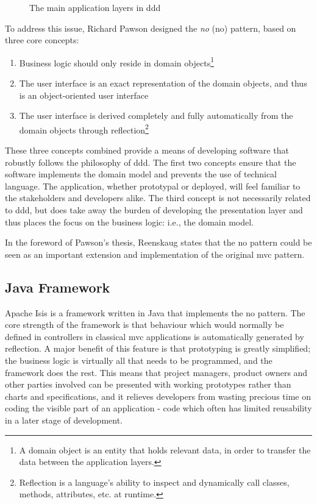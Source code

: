 \begin{figure}[h]
	\center
	
	\caption{The main application layers in \acrshort{ddd}}
	\label{figure:applicationlayers}
\end{figure}

To address this issue, Richard Pawson designed the \textit{\acrlong{no}} (\acrshort{no}) pattern, based on three core concepts\cite{pawson2002naked}:
\begin{enumerate}
	\item Business logic should only reside in domain objects\footnote{A domain object is an entity that holds relevant data, in order to transfer the data between the application layers.}
	
	\item The user interface is an exact representation of the domain objects, and thus is an object-oriented user interface
	
	\item The user interface is derived completely and fully automatically from the domain objects through reflection\footnote{Reflection is a language's ability to inspect and dynamically call classes, methods, attributes, etc. at runtime.}
\end{enumerate}

These three concepts combined provide a means of developing software that robustly follows the philosophy of \acrshort{ddd}. The first two concepts ensure that the software implements the domain model and prevents the use of technical language. The application, whether prototypal or deployed, will feel familiar to the stakeholders and developers alike. The third concept is not necessarily related to \acrshort{ddd}, but does take away the burden of developing the presentation layer and thus places the focus on the business logic: i.e., the domain model.

In the foreword of Pawson's thesis, Reenskaug states that the \acrshort{no} pattern could be seen as an important extension and implementation of the original \acrshort{mvc} pattern.

\subsection{Java Framework}
\label{subsection:javaframework}
Apache Isis is a framework written in Java that implements the \acrshort{no} pattern. The core strength of the framework is that behaviour which would normally be defined in controllers in classical \acrshort{mvc} applications is automatically generated by reflection. A major benefit of this feature is that prototyping is greatly simplified; the business logic is virtually all that needs to be programmed, and the framework does the rest. This means that project managers, product owners and other parties involved can be presented with working prototypes rather than charts and specifications, and it relieves developers from wasting precious time on coding the visible part of an application - code which often has limited reusability in a later stage of development.

